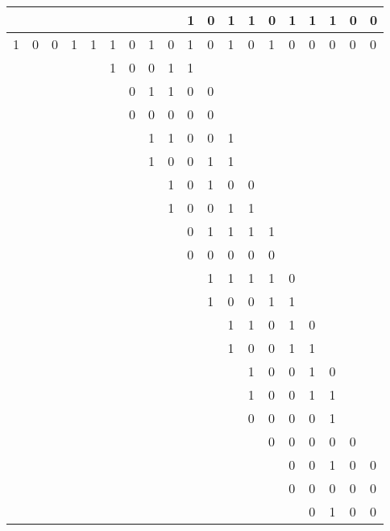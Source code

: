 \documentclass[twoside]{article}
\begin{document}
\begin{enumerate}
  \begin{tabular}{lllll|llllllllllllll}
      &   &   &   &   &   &   &   &   & 1 & 0 & 1 & 1 & 0 & 1 & 1 & 1 & 0 & 0    \\ \hline
    1 & 0 & 0 & 1 & 1 & 1 & 0 & 1 & 0 & 1 & 0 & 1 & 0 & 1 & 0 & 0 & 0 & 0 & 0  \\ 
      &   &   &   &   & 1 & 0 & 0 & 1 & 1 &   &   &   &   &   &   &   &   &    \\ \hline
      &   &   &   &   &   & 0 & 1 & 1 & 0 & 0 &   &   &   &   &   &   &   &    \\ 
      &   &   &   &   &   & 0 & 0 & 0 & 0 & 0 &   &   &   &   &   &   &   &    \\ \hline
      &   &   &   &   &   &   & 1 & 1 & 0 & 0 & 1 &   &   &   &   &   &   &    \\ 
      &   &   &   &   &   &   & 1 & 0 & 0 & 1 & 1 &   &   &   &   &   &   &    \\ \hline
      &   &   &   &   &   &   &   & 1 & 0 & 1 & 0 & 0 &   &   &   &   &   &    \\ 
      &   &   &   &   &   &   &   & 1 & 0 & 0 & 1 & 1 &   &   &   &   &   &    \\ \hline
      &   &   &   &   &   &   &   &   & 0 & 1 & 1 & 1 & 1 &   &   &   &   &    \\
      &   &   &   &   &   &   &   &   & 0 & 0 & 0 & 0 & 0 &   &   &   &   &    \\ \hline
      &   &   &   &   &   &   &   &   &   & 1 & 1 & 1 & 1 & 0 &   &   &   &    \\
      &   &   &   &   &   &   &   &   &   & 1 & 0 & 0 & 1 & 1 &   &   &   &    \\ \hline
      &   &   &   &   &   &   &   &   &   &   & 1 & 1 & 0 & 1 & 0 &   &   &    \\
      &   &   &   &   &   &   &   &   &   &   & 1 & 0 & 0 & 1 & 1 &   &   &    \\ \hline
      &   &   &   &   &   &   &   &   &   &   &   & 1 & 0 & 0 & 1 & 0 &   &    \\
      &   &   &   &   &   &   &   &   &   &   &   & 1 & 0 & 0 & 1 & 1 &   &    \\ \hline   
      &   &   &   &   &   &   &   &   &   &   &   & 0 & 0 & 0 & 0 & 1 &   &    \\ 
      &   &   &   &   &   &   &   &   &   &   &   &   & 0 & 0 & 0 & 0 & 0 &    \\ \hline
      &   &   &   &   &   &   &   &   &   &   &   &   &   & 0 & 0 & 1 & 0 & 0  \\
      &   &   &   &   &   &   &   &   &   &   &   &   &   & 0 & 0 & 0 & 0 & 0  \\ \hline  
      &   &   &   &   &   &   &   &   &   &   &   &   &   &   & 0 & 1 & 0 & 0  
    \end{tabular}


\end{enumerate}
\end{document}
